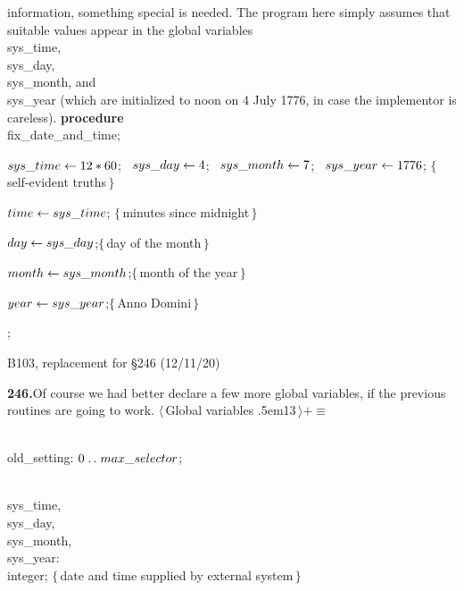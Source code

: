 \tenpoint\noindent
information, something special
is needed. The program here simply assumes that suitable values appear in
the global variables \\{sys\_time}, \\{sys\_day}, \\{sys\_month}, and
\\{sys\_year} (which are initialized to noon on 4 July 1776,
in case the implementor is careless).
\smallskip
\ninepoint\noindent
{\bf procedure} \\{fix\_date\_and\_time};\par
\noindent{}
$\\{sys\_time}\gets12\ast60$; \
$\\{sys\_day}\gets4$; \
$\\{sys\_month}\gets7$; \
$\\{sys\_year}\gets1776$;\quad
$\{\,$self-evident truths$\,\}$\par
\noindent\quad$\\{time}\gets\\{sys\_time}$;\quad
  $\{\,$minutes since midnight$\,\}$\par
\noindent\quad$\\{day}\gets\\{sys\_day}$;\quad$\{\,$day of the month$\,\}$\par
\noindent\quad$\\{month}\gets\\{sys\_month}$;\quad$\{\,$month of the year$\,\}$\par
\noindent\quad$\\{year}\gets\\{sys\_year}$;\quad$\{\,$Anno Domini$\,\}$\par
\noindent\quad{\bf end};

\bugonpage B103, replacement for \S246 (12/11/20)

\tenpoint\noindent
{\bf 246.}\quad Of course we had better declare a few more global variables,
if the previous routines are going to work.
\smallskip
\ninepoint\noindent
$\langle\,$Global variables {\sevenrm\kern.5em13}$\,\rangle+\equiv$\par
\noindent\\{old\_setting}: $0\mathrel{.\,.}\\{max\_selector}$;\par
\noindent\\{sys\_time}, \\{sys\_day}, \\{sys\_month}, \\{sys\_year}: \\{integer};
\quad$\{\,$date and time supplied by external system$\,\}$

